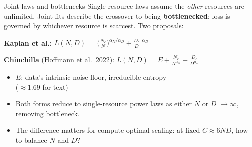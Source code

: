 \documentclass[11pt]{beamer}
\newcommand{\hl}[1]{{\color{blue!60!black}\textbf{#1}}}
\begin{document}
\begin{frame}{Joint laws and bottlenecks}
  Single-resource laws assume the \emph{other} resources are unlimited.
  Joint fits describe the crossover to being \hl{bottlenecked}: loss is
  governed by whichever resource is scarcest. Two proposals:
  \vspace{1mm}

  \hl{Kaplan et al.:}\quad
  $\displaystyle
    L(N, D) = \Big[\Big(\tfrac{N_c}{N}\Big)^{\alpha_N/\alpha_D}
    + \tfrac{D_c}{D}\Big]^{\alpha_D}
  $
  \vspace{1mm}

  \hl{Chinchilla} (Hoffmann et al.\ 2022):\quad
  $\displaystyle
    L(N, D) = E + \frac{N_c}{N^{\alpha_N}} + \frac{D_c}{D^{\alpha_D}}
  $
  \vspace{1mm}

  \begin{itemize}
    \item $E$: data's intrinsic noise floor, irreducible entropy \\ ($\approx 1.69$ for text)
    \item Both forms reduce to single-resource power laws as either $N$ or $D$ $\to\infty$, removing bottleneck.
    \item The difference matters for compute-optimal scaling: at fixed $C\approx 6ND$, how to balance $N$ and $D$?
  \end{itemize}
\end{frame}
\end{document}
